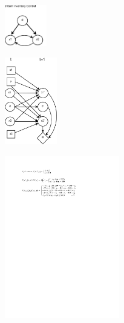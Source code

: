 \documentclass[twoside,11pt]{article}
\begin{document}
\begin{figure}[t!]
 \begin{subfigure}
                \centering
                \includegraphics[width=0.2\textwidth]{Figures1/diagrams/dbn_state.pdf}
        \end{subfigure}
                \hspace{2mm}
\begin{subfigure}
                \centering
                \includegraphics[width=0.25\textwidth]{Figures1/diagrams/dbn_inv2.pdf}
        \end{subfigure}
                        \hspace{-1mm}
\begin{subfigure}
                \centering
                \includegraphics[width=0.55\textwidth]{Figures2/diagrams/probabilities_2.pdf}

\end{subfigure}
\end{figure}
\end{document}
